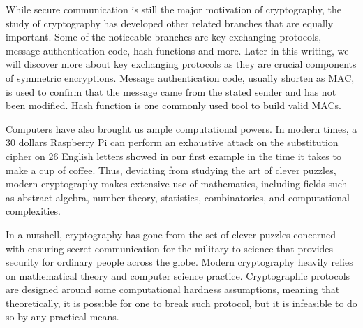 \par While secure communication is still the major motivation of cryptography, the study of cryptography has developed other related branches that are equally important. Some of the noticeable branches are key exchanging protocols, message authentication code, hash functions and more. Later in this writing, we will discover more about key exchanging protocols as they are crucial components of symmetric encryptions. Message authentication code, usually shorten as MAC, is used to confirm that the message came from the stated sender and has not been modified. Hash function is one commonly used tool to build valid MACs.
\par Computers have also brought us ample computational powers. In modern times, a 30 dollars Raspberry Pi can perform an exhaustive attack on the substitution cipher on 26 English letters showed in our first example in the time it takes to make a cup of coffee. Thus, deviating from studying the art of clever puzzles, modern cryptography makes extensive use of mathematics, including fields such as abstract algebra, number theory, statistics, combinatorics, and computational complexities.
\par In a nutshell, cryptography has gone from the set of clever puzzles concerned with ensuring secret communication for the military to science that provides security for ordinary people across the globe. Modern cryptography heavily relies on mathematical theory and computer science practice. Cryptographic protocols are designed around some computational hardness assumptions, meaning that theoretically, it is possible for one to break such protocol, but it is infeasible to do so by any practical means.

